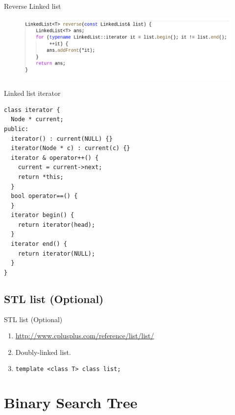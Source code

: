 \documentclass[aspectratio=169]{beamer}
\begin{document}
\begin{frame}{Reverse Linked list}
  \begin{figure}
    \includegraphics[width=\textwidth]{LL_reverse.png}
  \end{figure}
\end{frame}

\begin{frame}[fragile]{Linked list iterator}
\begin{lstlisting}
class iterator {
  Node * current;
public:
  iterator() : current(NULL) {}
  iterator(Node * c) : current(c) {}
  iterator & operator++() {
    current = current->next;
    return *this;
  }
  bool operator==() {
  }
  iterator begin() {
    return iterator(head);
  }
  iterator end() {
    return iterator(NULL);
  }
}
\end{lstlisting}
\end{frame}

\subsection{STL list (Optional)}
\begin{frame}[fragile]{STL list (Optional)}
        \begin{enumerate}
            \item \url{http://www.cplusplus.com/reference/list/list/}
            \item Doubly-linked list.
            \item \begin{verbatim}template <class T> class list;\end{verbatim}
        \end{enumerate}
\end{frame}

\section{Binary Search Tree}
\end{document}
